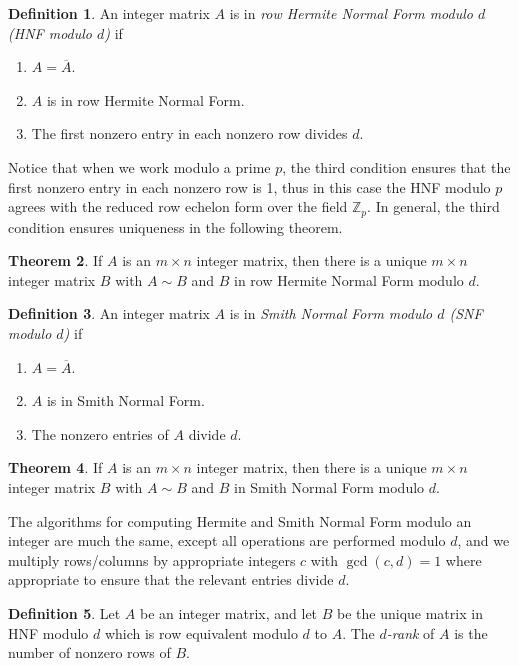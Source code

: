 \documentclass[12pt,a4paper]{article}
\newcommand{\Z}{\mathbb{Z}}
\theoremstyle{definition}
\newtheorem{theorem}{Theorem}[section]
\newtheorem{definition}[theorem]{Definition}
\begin{document}
\begin{definition}
  An integer matrix $A$ is in \emph{row Hermite Normal Form modulo $d$ (HNF modulo $d$)} if
  \begin{enumerate}
  \item $A=\overline{A}$.
  \item $A$ is in row Hermite Normal Form.
  \item The first nonzero entry in each nonzero row divides $d$.
  \end{enumerate}
\end{definition}

Notice that when we work modulo a prime $p$, the third condition ensures that the first nonzero entry in each nonzero row is 1, thus in this case the HNF modulo $p$ agrees with the reduced row echelon form over the field $\Z_p$. In general, the third condition ensures uniqueness in the following theorem.

\begin{theorem}
  If $A$ is an $m\times n$ integer matrix, then there is a unique $m\times n$ integer matrix $B$ with $A\sim B$ and $B$ in row Hermite Normal Form modulo $d$.
\end{theorem}

\begin{definition}
  An integer matrix $A$ is in \emph{Smith Normal Form modulo $d$ (SNF modulo $d$)} if
  \begin{enumerate}
  \item $A=\overline{A}$.
  \item $A$ is in Smith Normal Form.
  \item The nonzero entries of $A$ divide $d$.
  \end{enumerate}
\end{definition}

\begin{theorem}
  If $A$ is an $m\times n$ integer matrix, then there is a unique $m\times n$ integer matrix $B$ with $A\sim B$ and $B$ in Smith Normal Form modulo $d$.
\end{theorem}

The algorithms for computing Hermite and Smith Normal Form modulo an integer are much the same, except all operations are performed modulo $d$, and we multiply rows/columns by appropriate integers $c$ with $\gcd(c,d)=1$ where appropriate to ensure that the relevant entries divide $d$.

\begin{definition}
  Let $A$ be an integer matrix, and let $B$ be the unique matrix in HNF modulo $d$ which is row equivalent modulo $d$ to $A$. The \emph{$d$-rank} of $A$ is the number of nonzero rows of $B$.
\end{definition}
\end{document}
